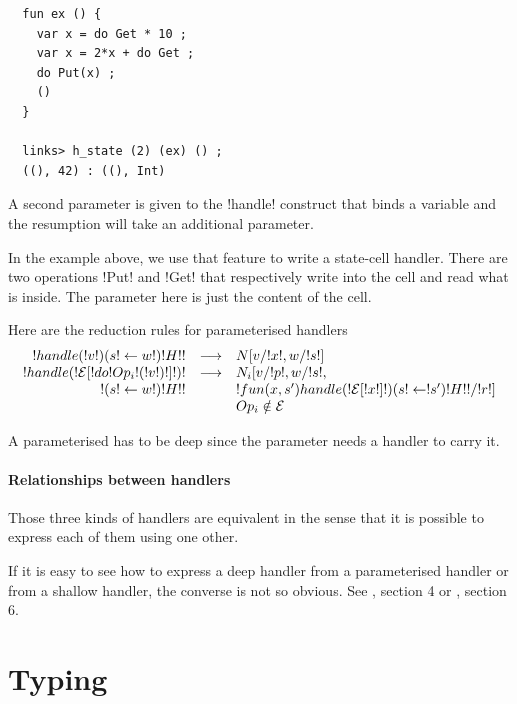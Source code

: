 \documentclass[10pt, nonacm=true, language=french, language=english]{acmart}
\begin{document}
\begin{lstlisting}
  fun ex () {
    var x = do Get * 10 ;
    var x = 2*x + do Get ;
    do Put(x) ;
    ()
  }

  links> h_state (2) (ex) () ;
  ((), 42) : ((), Int)
\end{lstlisting}

A second parameter is given to the !handle! construct that binds a variable and the resumption will take an additional parameter.

In the example above, we use that feature to write a state-cell handler. There are two operations !Put! and !Get! that respectively write into the cell and read what is inside. The parameter here is just the content of the cell.

Here are the reduction rules for parameterised handlers
\[
  \begin{array}{rcll}
    !handle ( !v! ) ( s!\leftarrow w! ) { !H! }! & \longrightarrow & N[v/!x!, w/!s!] \\
    !handle ( !\mathcal E[!do !Op_{i}!( !v! )!]! ) !  & \longrightarrow & N_{i}[v/!p!, w/!s!, \\
    ! ( s!\leftarrow w! ) { !H! }!                        &                 & !fun (x, s')  { handle ( !\mathcal E[!x!] ! ) ( s!\leftarrow!s' ) { !H! } }!/!r!] \\
                                                     &                 & Op_{i} \notin \mathcal E\\
  \end{array}
\]

\begin{rem}
  A parameterised has to be deep since the parameter needs a handler to carry it.
\end{rem}

\paragraph{Relationships between handlers}

Those three kinds of handlers are equivalent in the sense that it is possible to express each of them using one other.

If it is easy to see how to express a deep handler from a parameterised handler or from a shallow handler, the converse is not so obvious. See \citep{ehgc}, section 4 or \citep{daniel-thesis}, section 6.

\section{Typing}
\label{sec:typing}
\end{document}

